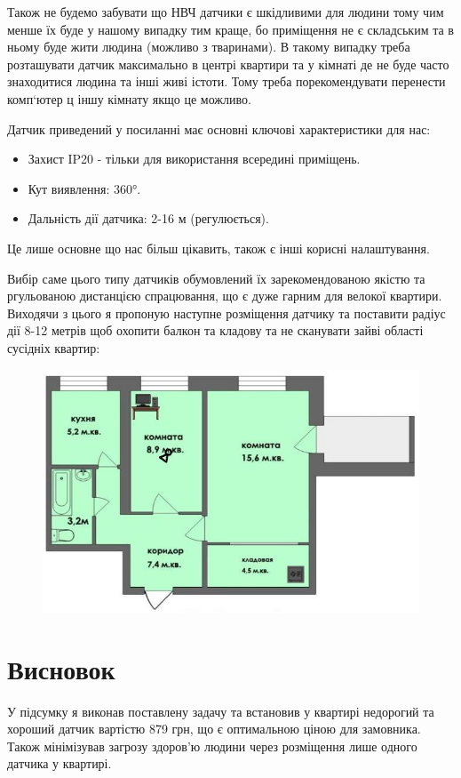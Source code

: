 Також не будемо забувати що НВЧ датчики є шкідливими для людини тому чим менше їх буде у нашому випадку тим краще, бо приміщення не є складським та в ньому буде жити людина (можливо з тваринами). В такому випадку треба розташувати датчик максимально в центрі квартири та у кімнаті де не буде часто знаходитися людина та інші живі істоти. Тому треба порекомендувати перенести комп`ютер ц іншу кімнату якщо це можливо.

\newpage
Датчик приведений у посиланні має основні ключові характеристики для нас:
\begin{itemize}
  \item Захист IP20 - тільки для використання всередині приміщень.
  \item Кут виявлення: 360°.
  \item Дальність дії датчика: 2-16 м (регулюється).
\end{itemize}

Це лише основне що нас більш цікавить, також є інші корисні налаштування.

Вибір саме цього типу датчиків обумовлений їх зарекомендованою якістю та ргульованою дистанцією спрацювання, що є дуже гарним для велокої квартири. Виходячи з цього я пропоную наступне розміщення датчику та поставити радіус дії 8-12 метрів щоб охопити балкон та кладову та не сканувати зайві області сусідніх квартир:

\begin{figure}[h!]
  \centering
  \includegraphics[width=17cm]{reports/info-protection/lab1/assets/flat-filled.jpeg}
\end{figure}

\newpage

\section{Висновок}
У підсумку я виконав поставлену задачу та встановив у квартирі недорогий та хороший датчик вартістю 879 грн, що є оптимальною ціною для замовника. Також мінімізував загрозу здоров'ю людини через розміщення лише одного датчика у квартирі.
